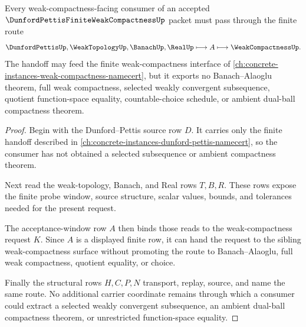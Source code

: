 \begin{theorem}
\label{thm:dunford-pettis-finite-weak-compactness-window-handoff}
Every weak-compactness-facing consumer of an accepted $\DunfordPettisFiniteWeakCompactnessUp$ packet must pass through the finite route
$$
\DunfordPettisUp,\WeakTopologyUp,\BanachUp,\RealUp
\longmapsto
A
\longmapsto
\WeakCompactnessUp .
$$
The handoff may feed the finite weak-compactness interface of \autoref{ch:concrete-instances-weak-compactness-namecert}, but it exports no Banach--Alaoglu theorem, full weak compactness, selected weakly convergent subsequence, quotient function-space equality, countable-choice schedule, or ambient dual-ball compactness theorem.
\end{theorem}
\begin{proof}
Begin with the Dunford--Pettis source row $D$. It carries only the finite handoff described in \autoref{ch:concrete-instances-dunford-pettis-namecert}, so the consumer has not obtained a selected subsequence or ambient compactness theorem.

Next read the weak-topology, Banach, and Real rows $T,B,R$. These rows expose the finite probe window, source structure, scalar values, bounds, and tolerances needed for the present request.

The acceptance-window row $A$ then binds those reads to the weak-compactness request $K$. Since $A$ is a displayed finite row, it can hand the request to the sibling weak-compactness surface without promoting the route to Banach--Alaoglu, full weak compactness, quotient equality, or choice.

Finally the structural rows $H,C,P,N$ transport, replay, source, and name the same route. No additional carrier coordinate remains through which a consumer could extract a selected weakly convergent subsequence, an ambient dual-ball compactness theorem, or unrestricted function-space equality.
\end{proof}


